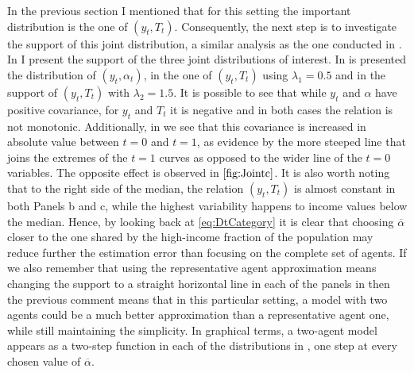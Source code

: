 \documentclass[english, a4paper, 12pt]{article}
\begin{document}
In the previous section I mentioned that for this setting the important distribution is the one of $(y_{t}, T_{t})$. Consequently, the next step is to investigate the support of this joint distribution, a similar analysis as the one conducted in . In  I present the support of the three joint distributions of interest. In  is presented the distribution of $(y_{t}, \alpha_{t})$, in  the one of $(y_{t}, T_{t})$ using $\lambda_{1} = 0.5$ and in  the support of $(y_{t}, T_{t})$ with $\lambda_{2} = 1.5$. It is possible to see that while $y_{t}$ and $\alpha$ have positive covariance, for $y_{t}$ and $T_{t}$ it is negative and in both cases the relation is not monotonic. Additionally, in  we see that this covariance is increased in absolute value between $t = 0$ and $t = 1$, as evidence by the more steeped line that joins the extremes of the $t=1$ curves as opposed to the wider line of the $t=0$ variables. The opposite effect is observed in $\Cref{fig:Jointc}$. It is also worth noting that to the right side of the median, the relation $(y_{t}, T_{t})$ is almost constant in both Panels b and c, while the highest variability happens to income values below the median. Hence, by looking back at \eqref{eq:DtCategory} it is clear that choosing $\overline{\alpha}$ closer to the one shared by the high-income fraction of the population may reduce further the estimation error than focusing on the complete set of agents. If we also remember that using the representative agent approximation means changing the support to a straight horizontal line in each of the panels in  then the previous comment means that in this particular setting, a model with two agents could be a much better approximation than a representative agent one, while still maintaining the simplicity. In graphical terms, a two-agent model appears as a two-step function in each of the distributions in , one step at every chosen value of $\overline{\alpha}$.
\end{document}
